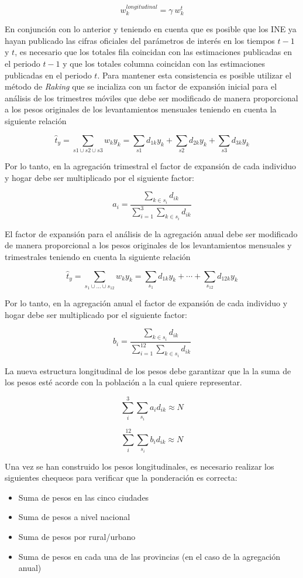 \documentclass[
  12pt,
  spanish,
]{book}
\providecommand{\tightlist}{%
  \setlength{\itemsep}{0pt}\setlength{\parskip}{0pt}}
\begin{document}
\[w_k^{longitudinal} = \gamma \  w_k^{t}\]

En conjunción con lo anterior y teniendo en cuenta que es posible que los INE ya hayan publicado las cifras oficiales del parámetros de interés en los tiempos \(t-1\) y \(t\), es necesario que los totales fila coincidan con las estimaciones publicadas en el periodo \(t-1\) y que los totales columna coincidan con las estimaciones publicadas en el periodo \(t\). Para mantener esta consistencia es posible utilizar el método de \emph{Raking} que se incializa con un factor de expansión inicial para el análisis de los trimestres móviles que debe ser modificado de manera proporcional a los pesos originales de los levantamientos mensuales teniendo en cuenta la siguiente relación

\[
\hat{t}_y = \sum_{s1 \cup s2 \cup s3} w_k y_k
= \sum_{s1} d_{1k} y_k + \sum_{s2} d_{2k} y_k + \sum_{s3} d_{3k} y_k
\]

Por lo tanto, en la agregación trimestral el factor de expansión de cada individuo y hogar debe ser multiplicado por el siguiente factor:

\[
a_i = \frac{\sum_{k\in s_i}d_{ik}}{\sum_{i=1}^{3}\sum_{k\in s_i}d_{ik}}
\]

El factor de expansión para el análisis de la agregación anual debe ser modificado de manera proporcional a los pesos originales de los levantamientos mensuales y trimestrales teniendo en cuenta la siguiente relación

\[
\hat{t}_y = \sum_{s_1 \cup ... \cup s_{12}} w_k y_k
= \sum_{s_1} d_{1k} y_k + \cdots + \sum_{s_{12}} d_{12k} y_k
\]

Por lo tanto, en la agregación anual el factor de expansión de cada individuo y hogar debe ser multiplicado por el siguiente factor:

\[
b_i = \frac{\sum_{k\in s_i}d_{ik}}{\sum_{i=1}^{12}\sum_{k\in s_i}d_{ik}}
\]

La nueva estructura longitudinal de los pesos debe garantizar que la la suma de los pesos esté acorde con la población a la cual quiere representar.

\[
\sum_{i}^{3}\sum_{s_i} a_i d_{ik} \approx N
\]

\[
\sum_{i}^{12}\sum_{s_i} b_i d_{ik} \approx N
\]

Una vez se han construido los pesos longitudinales, es necesario realizar los siguientes chequeos para verificar que la ponderación es correcta:

\begin{itemize}
\tightlist
\item
  Suma de pesos en las cinco ciudades
\item
  Suma de pesos a nivel nacional
\item
  Suma de pesos por rural/urbano
\item
  Suma de pesos en cada una de las provincias (en el caso de la agregación anual)
\end{itemize}
\end{document}
